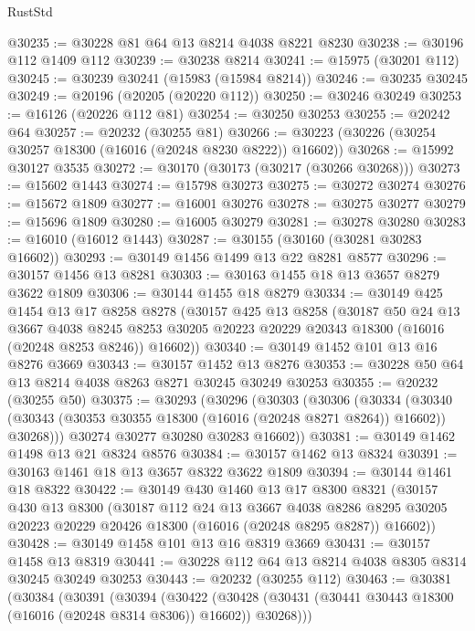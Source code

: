 \begin{lexlean}{RustStd}
\begin{coremodule}
@30235 := @30228 @81 @64 @13 @8214 @4038 @8221 @8230
@30238 := @30196 @112 @1409 @112
@30239 := @30238 @8214
@30241 := @15975 (@30201 @112)
@30245 := @30239 @30241 (@15983 (@15984 @8214))
@30246 := @30235 @30245
@30249 := @20196 (@20205 (@20220 @112))
@30250 := @30246 @30249
@30253 := @16126 (@20226 @112 @81)
@30254 := @30250 @30253
@30255 := @20242 @64
@30257 := @20232 (@30255 @81)
@30266 := @30223 (@30226 (@30254 @30257 @18300 (@16016 (@20248 @8230 @8222)) @16602))
@30268 := @15992 @30127 @3535
@30272 := @30170 (@30173 (@30217 (@30266 @30268)))
@30273 := @15602 @1443
@30274 := @15798 @30273
@30275 := @30272 @30274
@30276 := @15672 @1809
@30277 := @16001 @30276
@30278 := @30275 @30277
@30279 := @15696 @1809
@30280 := @16005 @30279
@30281 := @30278 @30280
@30283 := @16010 (@16012 @1443)
@30287 := @30155 (@30160 (@30281 @30283 @16602))
@30293 := @30149 @1456 @1499 @13 @22 @8281 @8577
@30296 := @30157 @1456 @13 @8281
@30303 := @30163 @1455 @18 @13 @3657 @8279 @3622 @1809
@30306 := @30144 @1455 @18 @8279
@30334 := @30149
    @425
    @1454
    @13
    @17
    @8258
    @8278
    (@30157
      @425
      @13
      @8258
      (@30187
        @50
        @24
        @13
        @3667
        @4038
        @8245
        @8253
        @30205
        @20223
        @20229
        @20343
        @18300
        (@16016 (@20248 @8253 @8246))
        @16602))
@30340 := @30149 @1452 @101 @13 @16 @8276 @3669
@30343 := @30157 @1452 @13 @8276
@30353 := @30228 @50 @64 @13 @8214 @4038 @8263 @8271 @30245 @30249 @30253
@30355 := @20232 (@30255 @50)
@30375 := @30293
    (@30296
      (@30303
        (@30306
          (@30334
            (@30340 (@30343 (@30353 @30355 @18300 (@16016 (@20248 @8271 @8264)) @16602)) @30268)))
        @30274
        @30277
        @30280
        @30283
        @16602))
@30381 := @30149 @1462 @1498 @13 @21 @8324 @8576
@30384 := @30157 @1462 @13 @8324
@30391 := @30163 @1461 @18 @13 @3657 @8322 @3622 @1809
@30394 := @30144 @1461 @18 @8322
@30422 := @30149
    @430
    @1460
    @13
    @17
    @8300
    @8321
    (@30157
      @430
      @13
      @8300
      (@30187
        @112
        @24
        @13
        @3667
        @4038
        @8286
        @8295
        @30205
        @20223
        @20229
        @20426
        @18300
        (@16016 (@20248 @8295 @8287))
        @16602))
@30428 := @30149 @1458 @101 @13 @16 @8319 @3669
@30431 := @30157 @1458 @13 @8319
@30441 := @30228 @112 @64 @13 @8214 @4038 @8305 @8314 @30245 @30249 @30253
@30443 := @20232 (@30255 @112)
@30463 := @30381
    (@30384
      (@30391
        (@30394
          (@30422
            (@30428 (@30431 (@30441 @30443 @18300 (@16016 (@20248 @8314 @8306)) @16602)) @30268)))

\end{coremodule}
\end{lexlean}
